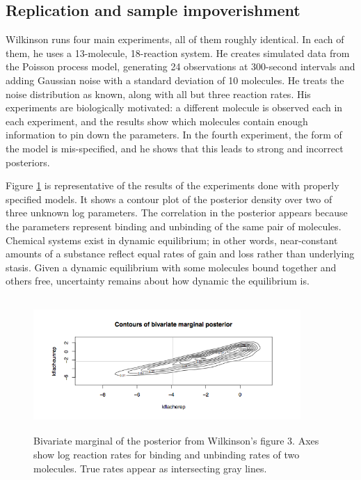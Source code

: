 \documentclass{article}
\begin{document}
\subsection{Replication and sample impoverishment}

Wilkinson runs four main experiments, all of them roughly identical. In each of them, he uses a 13-molecule, 18-reaction system. He creates simulated data from the Poisson process model, generating 24 observations at 300-second intervals and adding Gaussian noise with a standard deviation of 10 molecules. He treats the noise distribution as known, along with all but three reaction rates. His experiments are biologically motivated: a different molecule is observed each in each experiment, and the results show which molecules contain enough information to pin down the parameters. In the fourth experiment, the form of the model is mis-specified, and he shows that this leads to strong and incorrect posteriors.

Figure \ref{fig:SigD_trial_may27} is representative of the results of the experiments done with properly specified models. It shows a contour plot of the posterior density over two of three unknown log parameters. The correlation in the posterior appears because the parameters represent binding and unbinding of the same pair of molecules. Chemical systems exist in dynamic equilibrium; in other words, near-constant amounts of a substance reflect equal rates of gain and loss rather than underlying stasis. Given a dynamic equilibrium with some molecules bound together and others free, uncertainty remains about how dynamic the equilibrium is.

\begin{figure}[h!]
\begin{center}
\includegraphics[height=2in,width=4in]{wilkinson_fig3_biv.png}
\caption{ \label{fig:SigD_trial_may27} Bivariate marginal of the posterior from Wilkinson's figure 3. Axes show log reaction rates for binding and unbinding rates of two molecules. True rates appear as intersecting gray lines.}
\end{center}

\end{figure}
\end{document}
